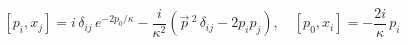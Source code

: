 \begin{equation}\label{26}
[p_i, x_j] = i\, \delta_{ij} \, e^{-
2p_0/\kappa} -\frac{i}{\kappa^2}\left(\vec{p}\,{}^{ 2}\, \delta_{ij} - 2
p_{i}p_{j}\right), \quad [p_0, x_i] = -\frac{2i}\kappa\, p_i
\end{equation}

